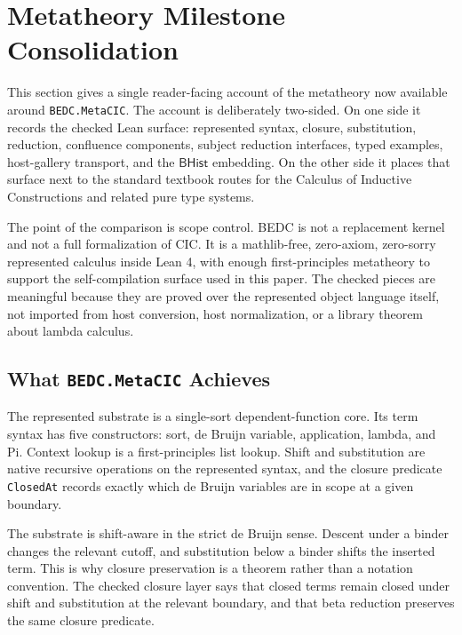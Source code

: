 \section{Metatheory Milestone Consolidation}
\label{sec:metatheory-milestone-consolidation}

This section gives a single reader-facing account of the metatheory now
available around \texttt{BEDC.MetaCIC}.  The account is deliberately two-sided.
On one side it records the checked Lean surface: represented syntax, closure,
substitution, reduction, confluence components, subject reduction interfaces,
typed examples, host-gallery transport, and the $\mathsf{BHist}$ embedding.
On the other side it places that surface next to the standard textbook routes
for the Calculus of Inductive Constructions and related pure type systems.

The point of the comparison is scope control.  BEDC is not a replacement
kernel and not a full formalization of CIC.  It is a mathlib-free,
zero-axiom, zero-sorry represented calculus inside Lean 4, with enough
first-principles metatheory to support the self-compilation surface used in
this paper.  The checked pieces are meaningful because they are proved over
the represented object language itself, not imported from host conversion,
host normalization, or a library theorem about lambda calculus.

\subsection{What \texttt{BEDC.MetaCIC} Achieves}
\label{subsec:metatheory-achieves}

The represented substrate is a single-sort dependent-function core.  Its term
syntax has five constructors: sort, de Bruijn variable, application, lambda,
and Pi.  Context lookup is a first-principles list lookup.  Shift and
substitution are native recursive operations on the represented syntax, and
the closure predicate \texttt{ClosedAt} records exactly which de Bruijn
variables are in scope at a given boundary.

The substrate is shift-aware in the strict de Bruijn sense.  Descent under a
binder changes the relevant cutoff, and substitution below a binder shifts the
inserted term.  This is why closure preservation is a theorem rather than a
notation convention.  The checked closure layer says that closed terms remain
closed under shift and substitution at the relevant boundary, and that beta
reduction preserves the same closure predicate.

